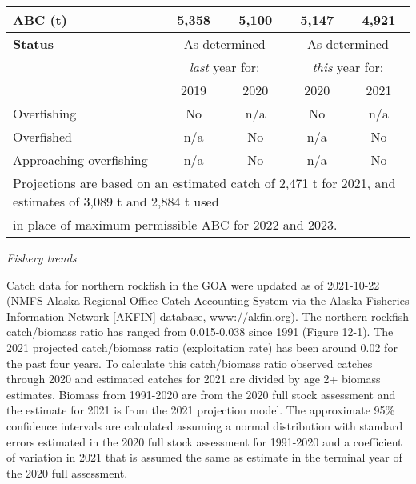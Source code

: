 \documentclass[
  11pt,
]{article}
\begin{document}
\begin{center}
\begin{tabular}{ |lcccc|}
     ABC (t)                              & \cellcolor[gray]{0.9} 5,358   & \cellcolor[gray]{0.9} 5,100  & \bf{5,147} & 4,921 \\
 \hline     
\bf{Status}  & \multicolumn{2}{c}{\cellcolor[gray]{0.9} As determined}         &  \multicolumn{2}{c|}{As determined} \\
             & \multicolumn{2}{c}{\cellcolor[gray]{0.9} \emph{last} year for:} &  \multicolumn{2}{c|}{\emph{this} year for:}\\
             & \cellcolor[gray]{0.9} 2019 & \cellcolor[gray]{0.9} 2020         & 2020 & 2021\\ 
 \hline       
    Overfishing             & \cellcolor[gray]{0.9}No & \cellcolor[gray]{0.9}n/a & No & n/a  \\
    Overfished              & \cellcolor[gray]{0.9} n/a & \cellcolor[gray]{0.9}No & n/a & No \\
    Approaching overfishing &\cellcolor[gray]{0.9} n/a & \cellcolor[gray]{0.9}No & n/a & No \\
\hline
\multicolumn{5}{l}{\footnotesize *Projections are based on an estimated catch of 2,471 t for 2021, and estimates of 3,089 t and 2,884 t used \par}\\
\multicolumn{5}{l}{\footnotesize in place of maximum permissible ABC for 2022 and 2023.\par}\\

\end{tabular}
\end{center}

\emph{Fishery trends}

Catch data for northern rockfish in the GOA were updated as of 2021-10-22 (NMFS Alaska Regional Office Catch Accounting System via the Alaska Fisheries Information Network {[}AKFIN{]} database, www://akfin.org).
The northern rockfish catch/biomass ratio has ranged from 0.015-0.038 since 1991 (Figure 12-1).
The 2021 projected catch/biomass ratio (exploitation rate) has been around 0.02 for the past four years.
To calculate this catch/biomass ratio observed catches through 2020 and estimated catches for 2021 are divided by age 2+ biomass estimates.
Biomass from 1991-2020 are from the 2020 full stock assessment and the estimate for 2021 is from the 2021 projection model.
The approximate 95\% confidence intervals are calculated assuming a normal distribution with standard errors estimated in the 2020 full stock assessment for 1991-2020 and a coefficient of variation in 2021 that is assumed the same as estimate in the terminal year of the 2020 full assessment.
\end{document}
